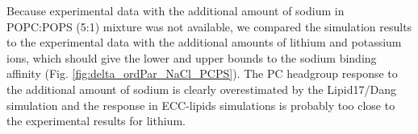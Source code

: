 \documentclass[journal=jpcbfk,manuscript=article]{achemso}
\begin{document}
Because experimental data with the additional amount of sodium in POPC:POPS (5:1) mixture was not available,
we compared the simulation results to the experimental data with the additional amounts of
lithium and potassium ions, which should give the lower and upper bounds to the sodium binding
affinity (Fig. \ref{fig:delta_ordPar_NaCl_PCPS}). The PC headgroup response to the additional
amount of sodium is clearly overestimated by the Lipid17/Dang simulation and
the response in ECC-lipids simulations is probably too close to the experimental results for lithium.




 
\end{document}
